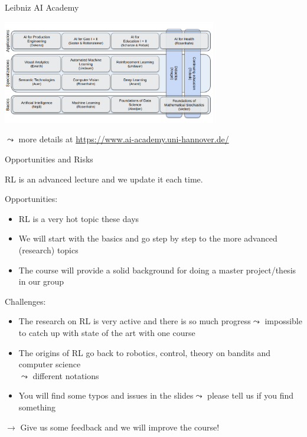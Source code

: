 \documentclass[aspectratio=169, handout]{../latex_main/tntbeamer}  %
\begin{document}
\begin{frame}{Leibniz AI Academy}
    
    \centering
    \includegraphics[width=0.7\textwidth]{images/LAI-New-Blue.png}

    $\leadsto$ more details at \url{https://www.ai-academy.uni-hannover.de/}

\end{frame}
\begin{frame}[c]{Opportunities and Risks}

RL is an advanced lecture and we update it each time.

\bigskip
\pause

Opportunities:
	\begin{itemize}
		\item RL is a very hot topic these days
		\item We will start with the basics and go step by step to the more advanced (research) topics
		\item The course will provide a solid background for doing a master project/thesis in our group 
	\end{itemize}
	
	\pause
	
	Challenges:
	\begin{itemize}
		\item The research on RL is very active and there is so much progress\newline $\leadsto$ impossible to catch up with state of the art with one course
		\item The origins of RL go back to robotics, control, theory on bandits and computer science\\ $\leadsto$ different notations
		\item You will find some typos and issues in the slides\newline $\leadsto$ please tell us if you find something
	\end{itemize}

\medskip
$\to$ Give us some feedback and we will improve the course!


\end{frame}
\end{document}
